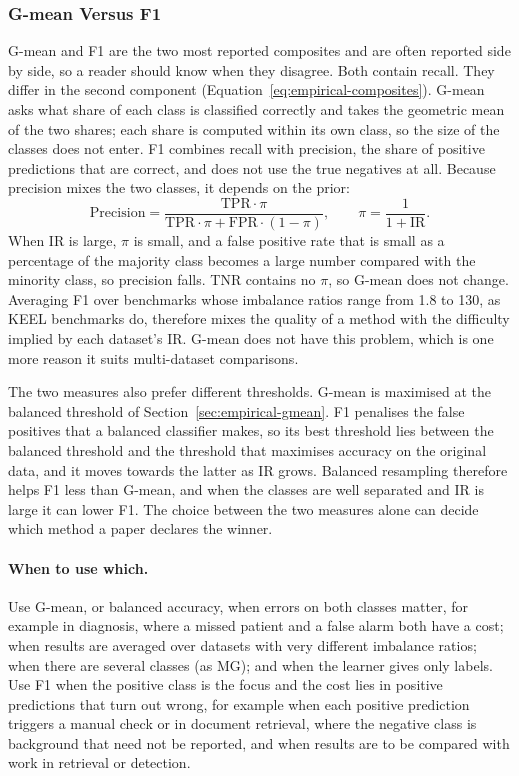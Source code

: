 \subsubsection{G-mean Versus F1}
\label{sec:empirical-f1}

G-mean and F1 are the two most reported composites and are often reported side by side, so a reader should know when they disagree. Both contain recall. They differ in the second component (Equation~\ref{eq:empirical-composites}). G-mean asks what share of each class is classified correctly and takes the geometric mean of the two shares; each share is computed within its own class, so the size of the classes does not enter. F1 combines recall with precision, the share of positive predictions that are correct, and does not use the true negatives at all. Because precision mixes the two classes, it depends on the prior:
\begin{equation}
  \mathrm{Precision} = \frac{\mathrm{TPR} \cdot \pi}{\mathrm{TPR} \cdot \pi + \mathrm{FPR} \cdot (1 - \pi)}, \qquad \pi = \frac{1}{1 + \mathrm{IR}}.
  \label{eq:empirical-precision-prior}
\end{equation}
When IR is large, $\pi$ is small, and a false positive rate that is small as a percentage of the majority class becomes a large number compared with the minority class, so precision falls. TNR contains no $\pi$, so G-mean does not change. Averaging F1 over benchmarks whose imbalance ratios range from 1.8 to 130, as KEEL benchmarks do, therefore mixes the quality of a method with the difficulty implied by each dataset's IR. G-mean does not have this problem, which is one more reason it suits multi-dataset comparisons.

The two measures also prefer different thresholds. G-mean is maximised at the balanced threshold of Section~\ref{sec:empirical-gmean}. F1 penalises the false positives that a balanced classifier makes, so its best threshold lies between the balanced threshold and the threshold that maximises accuracy on the original data, and it moves towards the latter as IR grows. Balanced resampling therefore helps F1 less than G-mean, and when the classes are well separated and IR is large it can lower F1. The choice between the two measures alone can decide which method a paper declares the winner.

\paragraph{When to use which.} Use G-mean, or balanced accuracy, when errors on both classes matter, for example in diagnosis, where a missed patient and a false alarm both have a cost; when results are averaged over datasets with very different imbalance ratios; when there are several classes (as MG); and when the learner gives only labels. Use F1 when the positive class is the focus and the cost lies in positive predictions that turn out wrong, for example when each positive prediction triggers a manual check or in document retrieval, where the negative class is background that need not be reported, and when results are to be compared with work in retrieval or detection.


